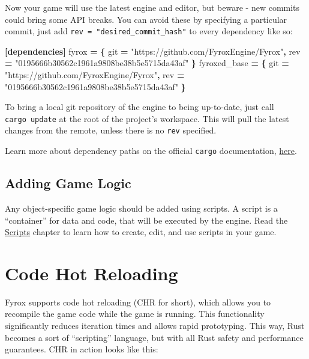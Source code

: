 \documentclass[
]{book}
\newenvironment{Shaded}{\begin{snugshade}}{\end{snugshade}}
\newcommand{\DataTypeTok}[1]{\textcolor[rgb]{0.13,0.29,0.53}{#1}}
\newcommand{\KeywordTok}[1]{\textcolor[rgb]{0.13,0.29,0.53}{\textbf{#1}}}
\newcommand{\OperatorTok}[1]{\textcolor[rgb]{0.81,0.36,0.00}{\textbf{#1}}}
\newcommand{\StringTok}[1]{\textcolor[rgb]{0.31,0.60,0.02}{#1}}
\theoremstyle{definition}
\theoremstyle{definition}
\theoremstyle{definition}
\theoremstyle{definition}
\theoremstyle{remark}
\begin{document}
Now your game will use the latest engine and editor, but beware - new commits could bring some API breaks. You can avoid these by specifying a particular commit, just add \texttt{rev\ =\ "desired\_commit\_hash"} to every dependency like so:

\begin{Shaded}
\begin{Highlighting}[]
\KeywordTok{[dependencies]}
\DataTypeTok{fyrox} \OperatorTok{=} \OperatorTok{\{ }\DataTypeTok{git}\OperatorTok{ =} \StringTok{"https://github.com/FyroxEngine/Fyrox"}\OperatorTok{, }\DataTypeTok{rev}\OperatorTok{ =} \StringTok{"0195666b30562c1961a9808be38b5e5715da43af"}\OperatorTok{ \}}
\DataTypeTok{fyroxed\_base} \OperatorTok{=} \OperatorTok{\{ }\DataTypeTok{git}\OperatorTok{ =} \StringTok{"https://github.com/FyroxEngine/Fyrox"}\OperatorTok{, }\DataTypeTok{rev}\OperatorTok{ =} \StringTok{"0195666b30562c1961a9808be38b5e5715da43af"}\OperatorTok{ \}}
\end{Highlighting}
\end{Shaded}

To bring a local git repository of the engine to being up-to-date, just call \texttt{cargo\ update} at the root of the project's workspace. This will pull the latest changes from the remote, unless there is no \texttt{rev} specified.

Learn more about dependency paths on the official \texttt{cargo} documentation, \href{https://doc.rust-lang.org/cargo/reference/specifying-dependencies.html\#specifying-dependencies-from-git-repositories}{here}.

\subsection{Adding Game Logic}\label{adding-game-logic}

Any object-specific game logic should be added using scripts. A script is a ``container'' for data and code, that will be executed by the engine. Read the \href{../scripting/script.md}{Scripts} chapter to learn how to create, edit, and use scripts in your game.

\section{Code Hot Reloading}\label{code-hot-reloading}

Fyrox supports code hot reloading (CHR for short), which allows you to recompile the game code while the game is running. This functionality significantly reduces iteration times and allows rapid prototyping. This way, Rust becomes a sort of ``scripting'' language, but with all Rust safety and performance guarantees. CHR in action looks like this:
\end{document}

